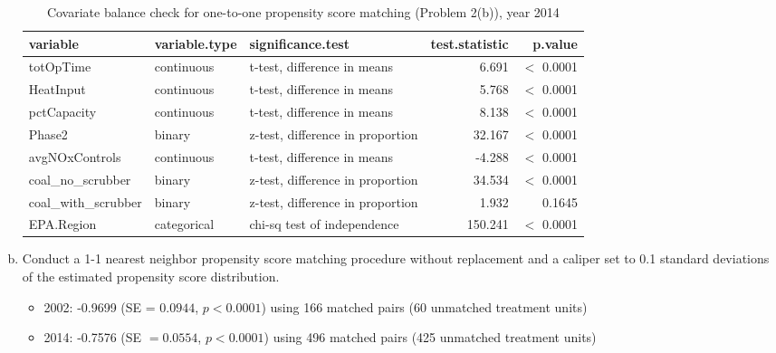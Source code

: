 \documentclass[11pt,letter]{article}
\begin{document}
\begin{enumerate}[(a)]
  \begin{table}[ht]
    \centering
    \begin{tabular}{lllrr}
      \toprule
      variable & variable.type & significance.test & test.statistic & p.value \\ 
      \midrule
      totOpTime & continuous & t-test, difference in means & 6.691 & $<$ 0.0001 \\ 
      HeatInput & continuous & t-test, difference in means & 5.768 & $<$ 0.0001 \\ 
      pctCapacity & continuous & t-test, difference in means & 8.138 & $<$ 0.0001 \\ 
      Phase2 & binary & z-test, difference in proportion & 32.167 & $<$ 0.0001 \\ 
      avgNOxControls & continuous & t-test, difference in means & -4.288 & $<$ 0.0001 \\ 
      coal\_no\_scrubber & binary & z-test, difference in proportion & 34.534 & $<$ 0.0001 \\ 
      coal\_with\_scrubber & binary & z-test, difference in proportion & 1.932 & 0.1645 \\ 
      EPA.Region & categorical & chi-sq test of independence & 150.241 & $<$ 0.0001 \\ 
      \bottomrule
    \end{tabular}
    \caption{Covariate balance check for one-to-one propensity score matching (Problem 2(b)), year 2014} 
    \label{tab-bal2b-14}
  \end{table}

\item
  \begin{quoting}
    Conduct a 1-1 nearest neighbor propensity score matching procedure
    without replacement and a caliper set to 0.1 standard deviations
    of the estimated propensity score distribution.
  \end{quoting}

  \begin{itemize}
  \item 2002: -0.9699 (SE = $0.0944$, $p < 0.0001$) using 166 matched
    pairs (60 unmatched treatment units)
  \item 2014: -0.7576 (SE $= 0.0554$, $p < 0.0001$) using 496 matched
    pairs (425 unmatched treatment units)
  \end{itemize}


\end{enumerate}
\end{document}
